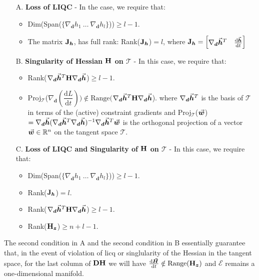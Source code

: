 \begin{enumerate}
	\item[A.] \textbf{Loss of LIQC} - In the case, we require that:
	\begin{itemize}
		\item Dim(Span($\{\nabla_{\bm{d}}h_1\ \dots\
		\nabla_{\bm{d}}h_l\}$))$\geq l-1$.
		\item The matrix $\mathbf{J}_{\bm{h}}$, has full rank:
		Rank($\mathbf{J}_{\bm{h}}$)$=l$, where $\mathbf{J}_{\bm{h}}=\begin{bmatrix}
			\nabla_{\bm{d}}\vec{\bm{h}}^T & \frac{\text{d}\vec{\bm{h}}}{\text{d}t}
		\end{bmatrix}$
	\end{itemize}
	\item[B.] \textbf{Singularity of Hessian $\mathbf{H}$ on $\mathcal{T}$} - In 
	this case, we require that:
	\begin{itemize}
		\item 
		Rank($\nabla_{\bm{d}}\vec{\bm{h}}^T\mathbf{H}\nabla_{\bm{d}}\vec{\bm{h}}$)$\geq 
		l-1$.
		\item
		Proj$_{\mathcal{T}}$($\nabla_{\bm{d}}(\dfrac{\text{d}L}{\text{d}t}))
		\notin\text{Range}($$\nabla_{\bm{d}}\vec{\bm{h}}^T\mathbf{H}\nabla_{\bm{d}}\vec{\bm{h}}$).\newline
		where $\nabla_{\bm{d}}\vec{\bm{h}}^T$ is the basis of $\mathcal{T}$ in 
		terms of the (active) constraint gradients and
		Proj$_{\mathcal{T}}$($\vec{\bm{w}}$)$ =
		\nabla_{\bm{d}}\vec{\bm{h}}(\nabla_{\bm{d}}\vec{\bm{h}}^T
		\nabla_{\bm{d}}\vec{\bm{h}})^{-1}\nabla_{\bm{d}}\vec{\bm{h}}^T\vec{\bm{w}}$ is 
		the orthogonal projection
		of a vector $\vec{\bm{w}}\in\mathbb{R}^n$ on the tangent space
		$\mathcal{T}$.
	\end{itemize}
	\item[C.] \textbf{Loss of LIQC and Singularity of $\mathbf{H}$ on 
	$\mathcal{T}$} - In this case, we require that:
	\begin{itemize}
		\item  Dim(Span($\{\nabla_{\bm{d}}h_1\ \dots\
		\nabla_{\bm{d}}h_l\}$))$\geq l-1$.
		\item Rank($\mathbf{J}_{\bm{h}}$)$=l$.
		\item 
		Rank($\nabla_{\bm{d}}\vec{\bm{h}}^T\mathbf{H}\nabla_{\bm{d}}\vec{\bm{h}}$)$\geq 
		l-1$.
		\item Rank($\mathbf{H}_{\bm{z}}$)$\geq n+l-1$.
	\end{itemize}
\end{enumerate}
The second condition in A and the second condition in B essentially guarantee
that, in the event of violation of \acrshort{licq} or singlularity of the 
Hessian in the tangent space, for the last column of $\mathbf{DH}$ we will have  
$\frac{\text{d}\vec{\bm{H}}}{\text{d}t}\notin\text{Range}(\mathbf{H}_{\bm{z}})$
and $\mathcal{E}$ remains a one-dimensional manifold. 

